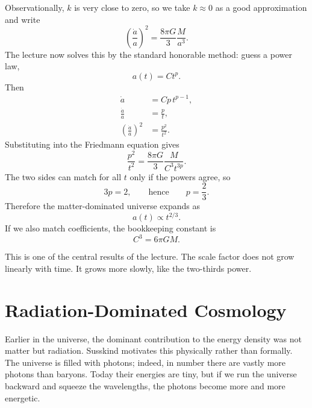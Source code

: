Observationally, \(k\) is very close to zero, so we take \(k\approx 0\) as a good approximation and write
\begin{equation}
\left(\frac{\dot a}{a}\right)^2=\frac{8\pi G}{3}\frac{M}{a^3}.
\end{equation}
The lecture now solves this by the standard honorable method: guess a power law,
\begin{equation}
a(t)=Ct^p.
\end{equation}
Then
\begin{align}
\dot a &= Cp\, t^{p-1},\\
\frac{\dot a}{a} &= \frac{p}{t},\\
\left(\frac{\dot a}{a}\right)^2 &= \frac{p^2}{t^2}.
\end{align}
Substituting into the Friedmann equation gives
\begin{equation}
\frac{p^2}{t^2}=\frac{8\pi G}{3}\frac{M}{C^3 t^{3p}}.
\end{equation}
The two sides can match for all \(t\) only if the powers agree, so
\begin{equation}
3p=2,
\qquad\text{hence}\qquad
p=\frac{2}{3}.
\end{equation}
Therefore the matter-dominated universe expands as
\begin{equation}
a(t)\propto t^{2/3}.
\end{equation}
If we also match coefficients, the bookkeeping constant is
\begin{equation}
C^3=6\pi G M.
\end{equation}

This is one of the central results of the lecture. The scale factor does not grow linearly with time. It grows more slowly, like the two-thirds power.

\section{Radiation-Dominated Cosmology}

Earlier in the universe, the dominant contribution to the energy density was not matter but radiation. Susskind motivates this physically rather than formally. The universe is filled with photons; indeed, in number there are vastly more photons than baryons. Today their energies are tiny, but if we run the universe backward and squeeze the wavelengths, the photons become more and more energetic.

